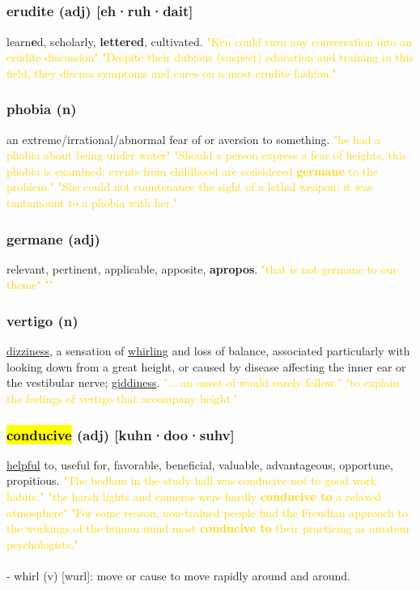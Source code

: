 \documentclass{proc}
\begin{document}
	\newpage
	\subsection{}
	\subsubsection{\textcolor{brickred}{erudite} (adj) [eh·ruh·dait]}
	learn\textbf{e}d,
	scholarly, \textbf{lettered},
	cultivated.
	\textcolor{gold}{"Ken could turn any conversation into an erudite discussion" "Despite their dubious (suspect) 
		education and training in this field, they discuss symptoms 
		and cures on a most erudite fashion."}
	
	\subsubsection{\textcolor{brickred}{phobia} (n)}
	an extreme/irrational/abnormal fear of or aversion to something.
	\textcolor{gold}{"he had a phobia about being under water" "Should a person 
		express a fear of heights, this phobia is examined; events 
		from childhood are considered \textbf{germane} to the problem." "She could not countenance the sight of a lethal weapon; it was tantamount to
		a phobia with her."}
	
	\subsubsection{\textcolor{brickred}{germane} (adj)}
	relevant,
	pertinent,
	applicable,
	apposite,
	\textbf{apropos}.
	\textcolor{gold}{"that is not germane to our theme" ""}
	
	\subsubsection{\textcolor{brickred}{vertigo} (n)}
	\underline{dizziness}, a sensation of \underline{whirling} and loss of balance, associated particularly with looking down from a great height, or caused by disease affecting the inner ear or the vestibular nerve; \underline{giddiness}.
	\textcolor{gold}{"... an onset of would surely follow." "to explain the feelings of 
		vertigo that accompany height."}
	
	\subsubsection{\textcolor{brickred}{\hl{conducive}} (adj) [kuhn·doo·suhv]}
	\underline{helpful} to,
	useful for,
	favorable,
	beneficial,
	valuable,
	advantageous,
	opportune,
	propitious.
	\textcolor{gold}{"The bedlam in the study hall was conducive not to good work habits." "the harsh lights and cameras were hardly \textbf{conducive to} a relaxed atmosphere" "For some reason, non-trained 
		people find the Freudian approach to the workings of the 
		human mind most \textbf{conducive to} their practicing as amateur 
		psychologists."}\\\\
	- whirl (v) [wurl]: move or cause to move rapidly around and around.
	
\end{document}
